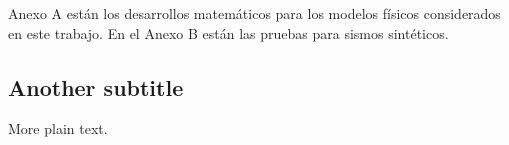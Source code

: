 \documentclass{article}
\begin{document}
Anexo A están los desarrollos matemáticos para los modelos físicos considerados
en este trabajo. En el Anexo B están las pruebas para sismos sintéticos.


\subsection{Another subtitle} 

More plain text.
\end{document}
